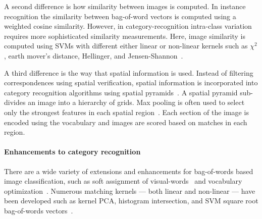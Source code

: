         A second difference is how similarity between images is computed. In instance recognition the similarity
        between bag-of-word vectors is computed using a weighted cosine similarity. However, in
        category-recognition intra-class variation requires more sophisticated similarity measurements. Here, image
        similarity is computed using SVMs with different either linear or non-linear kernels such as $\chi^2$,
        earth mover's distance, Hellinger, and Jensen-Shannon~\cite{zhang_local_2006, varma_learning_2007,
        vedaldi_efficient_2012}.

        A third difference is the way that spatial information is used. Instead of filtering correspondences using
        spatial verification, spatial information is incorporated into category recognition algorithms using
        spatial pyramids~\cite{grauman_pyramid_2005, lazebnik_beyond_2006}. A spatial pyramid sub-divides an image
        into a hierarchy of grids. Max pooling is often used to select only the strongest features in each spatial
        region~\cite{boureau_theoretical_2010, boureau_learning_2010}. Each section of the image is encoded using
        the vocabulary and images are scored based on matches in each region.

        \paragraph{Enhancements to category recognition}
        There are a wide variety of extensions and enhancements for bag-of-words based image classification, such
        as soft assignment of visual-words~\cite{liu_defense_2011} and vocabulary
        optimization~\cite{wang_locality_constrained_2010}. Numerous matching kernels --- both linear and
        non-linear --- have been developed such as kernel PCA, histogram intersection, and SVM square root
        bag-of-words vectors~\cite{vedaldi_multiple_2009, maji_classification_2008, perronnin_large_scale_2010}.

